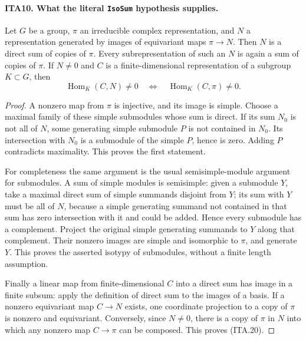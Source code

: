 \paragraph{ITA10. What the literal \texttt{IsoSum} hypothesis supplies.}
\label{claim:ITA10}
Let $G$ be a group, $\pi$ an irreducible complex representation,
and $N$ a representation generated by images of equivariant
maps $\pi\to N$.  Then $N$ is a direct sum of copies of
$\pi$.  Every subrepresentation of such an $N$ is again
a sum of copies of $\pi$.  If $N\ne0$ and $C$ is a
finite-dimensional representation of a subgroup $K\subset G$,
then
\[
                 \operatorname{Hom}_K(C,N)\ne0
                   \quad\Longleftrightarrow\quad
                 \operatorname{Hom}_K(C,\pi)\ne0.            \tag{ITA.20}
\]
\begin{proof}
A nonzero map from $\pi$ is injective, and its image is
simple.  Choose a maximal family of these simple
submodules whose sum is direct.  If its sum $N_0$ is not
all of $N$, some generating simple submodule $P$ is not
contained in $N_0$.  Its intersection with $N_0$ is a
submodule of the simple $P$, hence is zero.  Adding $P$
contradicts maximality.  This proves the first statement.

For completeness the same argument is the usual
semisimple-module argument for submodules.  A sum of
simple modules is semisimple: given a submodule $Y$, take
a maximal direct sum of simple summands disjoint from
$Y$; its sum with $Y$ must be all of $N$, because a
simple generating summand not contained in that sum has
zero intersection with it and could be added.  Hence
every submodule has a complement.  Project the original
simple generating summands to $Y$ along that complement.
Their nonzero images are simple and isomorphic to
$\pi$, and generate $Y$.  This proves the asserted
isotypy of submodules, without a finite length assumption.

Finally a linear map from finite-dimensional $C$ into a
direct sum has image in a finite subsum: apply the
definition of direct sum to the images of a basis.
If a nonzero equivariant map $C\to N$ exists, one
coordinate projection to a copy of $\pi$ is nonzero
and equivariant.  Conversely, since $N\ne0$, there is
a copy of $\pi$ in $N$ into which any nonzero map
$C\to\pi$ can be composed.  This proves (ITA.20).
\end{proof}

